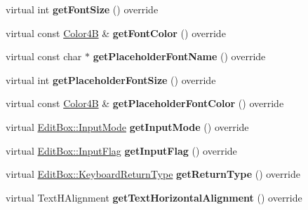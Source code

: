 \begin{DoxyCompactItemize}
virtual int {\bfseries get\+Font\+Size} () override
\item 
\mbox{\label{classui_1_1EditBoxImplCommon_a52a2c123a7fffa63625b5f97bc9e5f2e}} 
virtual const \hyperlink{structColor4B}{Color4B} \& {\bfseries get\+Font\+Color} () override
\item 
\mbox{\label{classui_1_1EditBoxImplCommon_a4ba35040d9ada264187d456ff91311e2}} 
virtual const char $\ast$ {\bfseries get\+Placeholder\+Font\+Name} () override
\item 
\mbox{\label{classui_1_1EditBoxImplCommon_aa20129b72e84b0f460573a2e235d0664}} 
virtual int {\bfseries get\+Placeholder\+Font\+Size} () override
\item 
\mbox{\label{classui_1_1EditBoxImplCommon_a8b42c3a82f03f60b359974264dfc976a}} 
virtual const \hyperlink{structColor4B}{Color4B} \& {\bfseries get\+Placeholder\+Font\+Color} () override
\item 
\mbox{\label{classui_1_1EditBoxImplCommon_a13927eee7595955e33eee0f0f878d677}} 
virtual \hyperlink{classui_1_1EditBox_a7a1bfe8f3ba218bedfcf5451ec3ce01a}{Edit\+Box\+::\+Input\+Mode} {\bfseries get\+Input\+Mode} () override
\item 
\mbox{\label{classui_1_1EditBoxImplCommon_ae807f5f4c7796e3909c0778aad482c09}} 
virtual \hyperlink{classui_1_1EditBox_af02f13ee9fba51d59bb3111e200848c8}{Edit\+Box\+::\+Input\+Flag} {\bfseries get\+Input\+Flag} () override
\item 
\mbox{\label{classui_1_1EditBoxImplCommon_a7404eaf3aea40fa87f741c58aa7c3e0d}} 
virtual \hyperlink{classui_1_1EditBox_a1e1285b6f742975b26bdeb8108ca6e51}{Edit\+Box\+::\+Keyboard\+Return\+Type} {\bfseries get\+Return\+Type} () override
\item 
\mbox{\label{classui_1_1EditBoxImplCommon_a31d5e686a2fefaddc948e0a84af1367c}} 
virtual Text\+H\+Alignment {\bfseries get\+Text\+Horizontal\+Alignment} () override
\item 
\mbox{\label{classui_1_1EditBoxImplCommon_af6db377f07258e873e404cddb1b6f7d5}} 

\end{DoxyCompactItemize}
